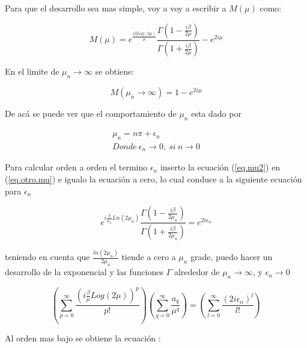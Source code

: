 Para que el desarrollo sea mas simple, voy a voy a escribir a $M (\mu)$ como:

\begin{equation}
M (\mu) = e ^{\frac{i \beta Log(2 \mu)}{\mu}}
\frac{\Gamma (1- \frac{i \beta}{2 \mu})}{\Gamma (1 + \frac{i \beta}{2 \mu})}
- e ^{2 i \mu}
\label{eq.otro.mu}
\end{equation}


En el limite de $\mu _n \rightarrow \infty$ se obtiene:

\begin{equation}
    M(\mu _n \rightarrow \infty) = 
	1 - e ^{2 i \mu}
\end{equation}

De acá se puede ver que el comportamiento de $\mu _n$ esta dado por 


\begin{equation}
\begin{array}{c}
    \mu _n = n \pi + \epsilon _n \\
    Donde \ \epsilon _n \rightarrow{0} ,\ si \ n \rightarrow{0}
\end{array}
\label{eq.mu2}
\end{equation}



Para calcular orden a orden el termino $\epsilon _n$ inserto la ecuación (\ref{eq.mu2}) en (\ref{eq.otro.mu}) e igualo la ecuación a cero, lo cual conduce a la siguiente ecuación para $\epsilon _n$

\begin{equation}
	e ^{ i \frac{\beta}{ \mu _n} Ln(2 \mu _n)}     
    \frac{\Gamma(1 - \frac{i \beta}{2  \mu _n} ) }
    {\Gamma(1 +  \frac{i \beta}{2  \mu _n} )} =    
    e ^{2 i \epsilon _n }
\end{equation}

teniendo en cuenta que $\frac{ln(2 \mu _n)}{2 \mu _n }$ tiende a cero a $\mu _n$ grade, puedo hacer un desarrollo de la exponencial y las funciones $\Gamma$ alrededor de $ \mu _n \rightarrow \infty $, y $\epsilon _n \rightarrow 0$

\begin{equation}
    \left(
    \sum _{p = 0} ^{\infty} \frac{ \left( i \frac{\beta}{ \mu} Log(2 \mu ) \right) ^p }{p!}
    \right)
    \left(
	\sum _{q = 0} ^{\infty} \frac{a _q}{\mu ^q}
	\right)
    =
    \left(
    \sum _{l = 0} ^{\infty} \frac{( 2 i \epsilon _n)^l}{l !}
    \right)
\end{equation}


Al orden mas bajo se obtiene la ecuación : 

